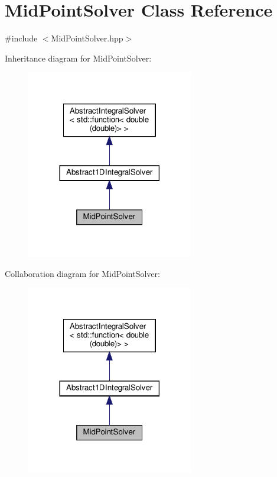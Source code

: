 \hypertarget{class_mid_point_solver}{}\section{Mid\+Point\+Solver Class Reference}
\label{class_mid_point_solver}


{\ttfamily \#include $<$Mid\+Point\+Solver.\+hpp$>$}



Inheritance diagram for Mid\+Point\+Solver\+:
\nopagebreak
\begin{figure}[H]
\begin{center}
\leavevmode
\includegraphics[width=206pt]{class_mid_point_solver__inherit__graph}
\end{center}
\end{figure}


Collaboration diagram for Mid\+Point\+Solver\+:
\nopagebreak
\begin{figure}[H]
\begin{center}
\leavevmode
\includegraphics[width=206pt]{class_mid_point_solver__coll__graph}
\end{center}
\end{figure}
